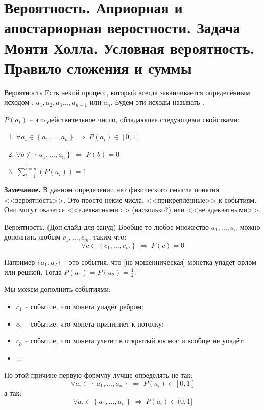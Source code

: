 \section{Вероятность. Априорная и апостариорная веростности. Задача Монти Холла. Условная вероятность. Правило сложения и суммы}\label{section:probability}

\begin{frame}{Вероятность}
	Есть некий процесс, который всегда заканчивается определённым исходом : $a_1, a_2, a_3 ..., a_{n-1}$ или $a_n$.
	Будем эти исходы называть .
	
	 $P(a_i)$ -- это действительное число, обладающее следующими свойствами:
\begin{enumerate}
	\item $\forall a_i \in \left\{a_1, ..., a_n \right\} ~\Longrightarrow~ P(a_i) \in [0, 1]$
	\item $\forall b \notin \left\{a_1, ..., a_n \right\} ~\Longrightarrow~ P(b) = 0$
	\item $\sum_{i=1}^{i=n}\left(P(a_i)\right) = 1$
\end{enumerate}


\textbf{Замечание.}
В данном определении нет физического смысла понятия 
<<вероятность>>. Это просто некие числа, 
<<прикреплённые>> к событиям.
Они могут оказатся <<адекватными>> (насколько?)
или <<не адекватными>>.

\end{frame}

\begin{frame}{Вероятность. (Доп.слайд для зануд)}
\footnotesize
Вообще-то любое множество ${a_1, ..., a_n}$  
можно дополнить любым ${c_1, ..., c_m}$, 
таким что:
\begin{equation*}
	 \forall c \in \left\{c_1, ..., c_m \right\} ~\Longrightarrow~ P(c) = 0
\end{equation*}

Например $\{a_1, a_2\}$ -- это события, 
что [не мошенническая] монетка
упадёт орлом или решкой. Тогда $P(a_1) = P(a_2) = \frac{1}{2}$.

Мы можем дополнить событиями:
\begin{itemize}
	\item $c_1$ -- событие, что монета упадёт ребром;
	\item $c_2$ -- событие, что монета прилипнет к потолку;
	\item $c_3$ -- событие, что монета улетит в открытый космос и вообще не упадёт;
	\item ... 
\end{itemize}

По этой причине первую формулу лучше определять не так:
\begin{equation*}
 \forall a_i \in \left\{a_1, ..., a_n \right\} ~\Longrightarrow~ P(a_i) \in [0, 1]
\end{equation*}
а так:
\begin{equation*}
\forall a_i \in \left\{a_1, ..., a_n \right\} ~\Longrightarrow~ P(a_i) \in (0, 1]
\end{equation*}

\end{frame}


